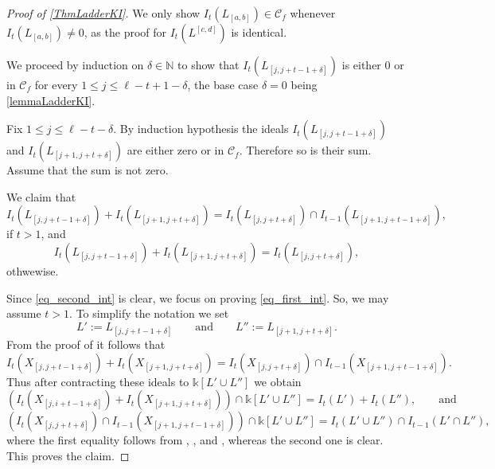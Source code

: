 \documentclass[12pt]{amsart}
\theoremstyle{definition}
\renewcommand{\(}{\left(}
\renewcommand{\)}{\right)}
\newcommand{\NN}{\mathbb{N} }
\newcommand{\Ht}{\operatorname{ht}}
\renewcommand{\!}[1]{{\color{red}\text{\Huge$\star$ }#1}}
\newcommand{\ls}{\leqslant}%
\begin{document}
\begin{proof}[Proof of \autoref{ThmLadderKI}]
We only show $I_t\left(L_{[a,b]}\right) \in \mathcal{C}_f$ whenever $I_t\left(L_{[a,b]}\right) \neq 0$, as the proof for $I_t\left(L^{[c,d]}\right) $ is identical.


We proceed by induction on $\delta\in \NN$ to show that $I_t\left(L_{[j,j+t-1+\delta]}\right)$ is either 0 or in $\mathcal{C}_f$  for every $1\ls j\ls \ell-t+1-\delta$, the base case $\delta=0$ being 
\autoref{lemmaLadderKI}. %

Fix $1\ls j\ls \ell-t-\delta$. By  induction hypothesis  the ideals $I_t\left(L_{[j,j+t-1+\delta]}\right)$ and $I_t\left(L_{[j+1,j+t+\delta]}\right)$ are either zero or in $\mathcal{C}_f$. Therefore so is their  sum. Assume that the sum is not zero.  

We claim that 
\begin{equation}\label{eq_first_int}
I_t\left(L_{[j,j+t-1+\delta]}\right)+I_t\left(L_{[j+1,j+t+\delta]}\right)=I_t\left(L_{[j,j+t+\delta]}\right) \cap I_{t-1}\left(L_{[j+1,j+t-1+\delta]}\right),
\end{equation}
if  $t>1$, %
 and  
\begin{equation}\label{eq_second_int}
	I_t\left(L_{[j,j+t-1+\delta]}\right)+I_t\left(L_{[j+1,j+t+\delta]}\right)=I_t\left(L_{[j,j+t+\delta]}\right),
\end{equation}
othwewise.

Since \autoref{eq_second_int} is clear, we focus on proving \autoref{eq_first_int}. So, we may assume  $t>1$.  %
To simplify the notation we set 
$$L':=L_{[j,j+t-1+\delta]}\qquad \text{and} \qquad L'':=L_{[j+1,j+t+\delta]}.$$ 
 From the proof of \cite[Theorem~2.1]{seccia2022knutson} it follows that $$I_t\left(X_{[j,j+t-1+\delta]}\right)+I_t\left(X_{[j+1,j+t+\delta]}\right)=I_t\left(X_{[j,j+t+\delta]}\right) \cap I_{t-1}\left(X_{[j+1,j+t-1+\delta]}\right).$$
 Thus after contracting these ideals to $\mathbb{k}[L' \cup L'']$ we obtain
$$
  \left( I_t\left(X_{[j,i+t-1+\delta]}\right)+I_t\left(X_{[j+1,j+t+\delta]}\right)\right) \cap \mathbb{k}[L' \cup L'']=I_t(L') + I_{t}(L''),\qquad\text{and}$$
  $$
  \left(I_t\left(X_{[j,j+t+\delta]}\right) \cap I_{t-1}\left(X_{[j+1,j+t-1+\delta]}\right)\right)\cap \mathbb{k}[L' \cup L'']= I_t(L' \cup L'') \cap I_{t-1}(L' \cap L''),
$$
where the first equality follows from \cite[Lemma 2.2]{seccia2022knutson}, \cite[Corollary 2]{knutson2009frobenius}, and  \cite[Lemma 1.8]{GorlaMixed}, whereas the second one is clear.  
 This proves the claim. 
 

\end{proof}
\end{document}
